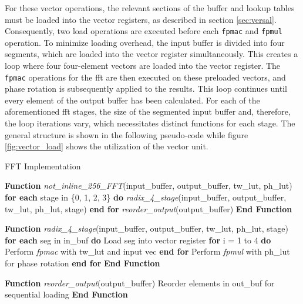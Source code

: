 For these vector operations, the relevant sections of the buffer and lookup tables must be loaded into the vector registers, as described in section \ref{sec:versal}. Consequently, two load operations are executed before each \texttt{fpmac} and \texttt{fpmul} operation. To minimize loading overhead, the input buffer is divided into four segments, which are loaded into the vector register simultaneously. This creates a loop where four four-element vectors are loaded into the vector register. The \texttt{fpmac} operations for the \ac{fft} are then executed on these preloaded vectors, and phase rotation is subsequently applied to the results. This loop continues until every element of the output buffer has been calculated. For each of the aforementioned \ac{fft} stages, the size of the segmented input buffer and, therefore, the loop iterations vary, which necessitates distinct functions for each stage. The general structure is shown in the following pseudo-code while figure \ref{fig:vector_load} shows the utilization of the vector unit.\par

\begin{algorithm}
\caption{FFT Implementation} \label{alg:FFT}
\begin{footnotesize} %
\begin{algorithmic}
\STATE \textbf{Function} \textit{not\_inline\_256\_FFT}(input\_buffer, output\_buffer, tw\_lut, ph\_lut)
    \STATE \hspace{0.3cm} \textbf{for each} stage in \{0, 1, 2, 3\} \textbf{do}
    \STATE \hspace{0.6cm} \textit{radix\_4\_stage}(input\_buffer, output\_buffer, tw\_lut, ph\_lut, stage)
    \STATE \hspace{0.3cm} \textbf{end for}
    \STATE \hspace{0.3cm} \textit{reorder\_output}(output\_buffer)
\STATE \textbf{End Function}

\STATE \textbf{Function} \textit{radix\_4\_stage}(input\_buffer, output\_buffer, tw\_lut, ph\_lut, stage)
    \STATE \hspace{0.3cm} \textbf{for each} seg in in\_buf \textbf{do}
    \STATE \hspace{0.6cm} Load seg into vector register
    \STATE \hspace{0.6cm} \textbf{for} i = 1 to 4 \textbf{do}
    \STATE \hspace{0.9cm} Perform \textit{fpmac} with tw\_lut and input vec
    \STATE \hspace{0.6cm} \textbf{end for}
    \STATE \hspace{0.6cm} Perform \textit{fpmul} with ph\_lut for phase rotation
    \STATE \hspace{0.3cm} \textbf{end for}
\STATE \textbf{End Function}

\STATE \textbf{Function} \textit{reorder\_output}(output\_buffer)
    \STATE \hspace{0.3cm} Reorder elements in out\_buf for sequential loading
\STATE \textbf{End Function}
\end{algorithmic}
\end{footnotesize}
\end{algorithm}


